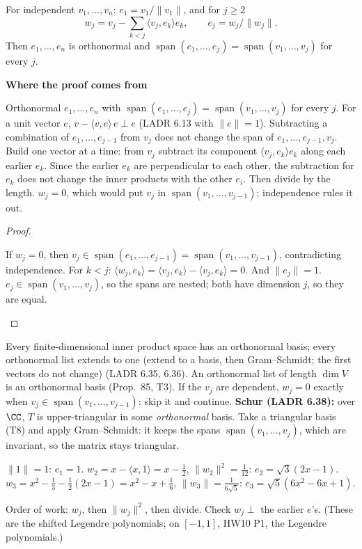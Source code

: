 \documentclass[10pt]{scrartcl}
\DeclareMathOperator{\spn}{span}
\newcommand{\PP}{\mathcal P}
\newcommand{\ip}[2]{\langle #1,#2\rangle}
\newenvironment{motive}{\begin{mdframed}[style=thinkbox]\textbf{\color{OliveGreen!75!black}Where the proof comes from}\begin{description}[leftmargin=0.9em,labelindent=0pt,itemsep=2pt,topsep=2pt,font=\normalfont\bfseries\color{OliveGreen!70!black}]}{\end{description}\end{mdframed}}
\newenvironment{steps}{\begin{enumerate}[label=\arabic*.,leftmargin=1.5em,itemsep=2pt,topsep=2pt]}{\end{enumerate}}
\begin{document}
\begin{theorem*}
  For independent $v_1,\dots,v_n$: $e_1=v_1/\|v_1\|$, and for $j\ge2$
  \[ w_j=v_j-\sum_{k<j}\ip{v_j}{e_k}e_k,\qquad e_j=w_j/\|w_j\|. \]
  Then $e_1,\dots,e_n$ is orthonormal and $\spn(e_1,\dots,e_j)=\spn(v_1,\dots,v_j)$ for every $j$.
\end{theorem*}
\begin{motive}
  \ii[Want.] Orthonormal $e_1,\dots,e_n$ with $\spn(e_1,\dots,e_j)=\spn(v_1,\dots,v_j)$ for every $j$.
  \ii[Know.] For a unit vector $e$, $v-\ip ve\,e\perp e$ (LADR 6.13 with $\|e\|=1$). Subtracting a combination of $e_1,\dots,e_{j-1}$ from $v_j$ does not change the span of $e_1,\dots,e_{j-1},v_j$.
   Build one vector at a time: from $v_j$ subtract its component $\ip{v_j}{e_k}e_k$ along each earlier $e_k$. Since the earlier $e_k$ are perpendicular to each other, the subtraction for $e_k$ does not change the inner products with the other $e_i$. Then divide by the length.
   $w_j=0$, which would put $v_j$ in $\spn(v_1,\dots,v_{j-1})$; independence rules it out.
\end{motive}
\begin{proof}
  \begin{steps}
    \ii If $w_j=0$, then $v_j\in\spn(e_1,\dots,e_{j-1})=\spn(v_1,\dots,v_{j-1})$, contradicting independence.
    \ii For $k<j$: $\ip{w_j}{e_k}=\ip{v_j}{e_k}-\ip{v_j}{e_k}=0$. And $\|e_j\|=1$.
    \ii $e_j\in\spn(v_1,\dots,v_j)$, so the spans are nested; both have dimension $j$, so they are equal.
  \end{steps}
\end{proof}
\begin{itemize}
  \ii Every finite-dimensional inner product space has an orthonormal basis; every orthonormal list extends to one (extend to a basis, then Gram--Schmidt; the first vectors do not change) (LADR 6.35, 6.36).
  \ii An orthonormal list of length $\dim V$ is an orthonormal basis (Prop.~85, T3).
  \ii If the $v_j$ are dependent, $w_j=0$ exactly when $v_j\in\spn(v_1,\dots,v_{j-1})$: skip it and continue.
  \ii \textbf{Schur (LADR 6.38):} over $\CC$, $T$ is upper-triangular in some \emph{orthonormal} basis. Take a triangular basis (T8) and apply Gram--Schmidt: it keeps the spans $\spn(v_1,\dots,v_j)$, which are invariant, so the matrix stays triangular.
\end{itemize}

\begin{example*}[Ex.~70: Gram--Schmidt on $\PP_2$, $\ip pq=\int_0^1p\bar q$]
  \begin{steps}
    \ii $\|1\|=1$: $e_1=1$.
    \ii $w_2=x-\ip x1=x-\frac12$, $\|w_2\|^2=\frac1{12}$: $e_2=\sqrt3(2x-1)$.
    \ii $w_3=x^2-\frac13-\frac12(2x-1)=x^2-x+\frac16$, $\|w_3\|=\frac1{6\sqrt5}$: $e_3=\sqrt5(6x^2-6x+1)$.
  \end{steps}
  Order of work: $w_j$, then $\|w_j\|^2$, then divide. Check $w_j\perp$ the earlier $e$'s. (These are the shifted Legendre polynomials; on $[-1,1]$, HW10 P1, the Legendre polynomials.)
\end{example*}
\end{document}
